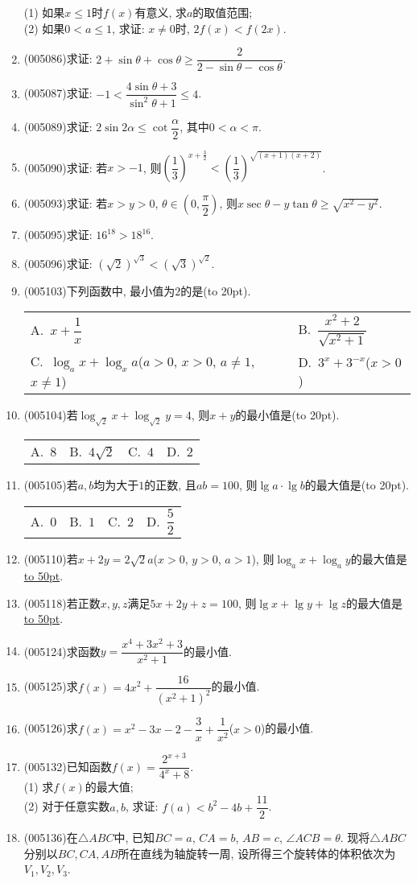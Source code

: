 \documentclass[10pt,a4paper]{article}
\newcommand{\blank}[1]{\underline{\hbox to #1pt{}}}
\newcommand{\bracket}[1]{(\hbox to #1pt{})}
\newcommand{\twoch}[4]{\par\begin{tabular}{p{.46\textwidth}p{.46\textwidth}}
A.~#1& B.~#2\\
C.~#3& D.~#4
\end{tabular}}
\newcommand{\fourch}[4]{\par\begin{tabular}{p{.23\textwidth}p{.23\textwidth}p{.23\textwidth}p{.23\textwidth}}
A.~#1 &B.~#2& C.~#3& D.~#4
\end{tabular}}
\begin{document}
\begin{enumerate}[1.]
(1) 如果$x\le 1$时$f(x)$有意义, 求$a$的取值范围;\\
(2) 如果$0<a\le 1$, 求证: $x\ne 0$时, $2f(x)<f(2x)$.
\item {\tiny (005086)}求证: $2+\sin \theta +\cos \theta \ge \dfrac 2{2-\sin \theta -\cos \theta }$.
\item {\tiny (005087)}求证: $-1<\dfrac{4\sin \theta +3}{\sin^2\theta+1}\le 4$.
\item {\tiny (005089)}求证: $2\sin 2\alpha \le \cot \dfrac{\alpha}2$, 其中$0<\alpha <\pi$.
\item {\tiny (005090)}求证: 若$x>-1$, 则$(\dfrac 13)^{x+\frac 32}<(\dfrac 13)^{\sqrt{(x+1)(x+2)}}$.
\item {\tiny (005093)}求证: 若$x>y>0$, $\theta \in (0,\dfrac{\pi}2)$, 则$x\sec \theta -y\tan \theta \ge \sqrt{x^2-y^2}$.
\item {\tiny (005095)}求证: $16^{18}>18^{16}$.
\item {\tiny (005096)}求证: $(\sqrt 2)^{\sqrt 3}<(\sqrt 3)^{\sqrt 2}$.
\item {\tiny (005103)}下列函数中, 最小值为$2$的是\bracket{20}.
\twoch{$x+\dfrac 1x$}{$\dfrac{x^2+2}{\sqrt{x^2+1}}$}{$\log_ax+\log_xa$($a>0$, $x>0$, $a\ne 1$, $x\ne 1$)}{$3^x+3^{-x}$($x>0$)}
\item {\tiny (005104)}若$\log_{\sqrt 2}x+\log_{\sqrt 2}y=4$, 则$x+y$的最小值是\bracket{20}.
\fourch{$8$}{$4\sqrt 2$}{$4$}{$2$}
\item {\tiny (005105)}若$a,b$均为大于$1$的正数, 且$ab=100$, 则$\lg a\cdot \lg b$的最大值是\bracket{20}.
\fourch{$0$}{$1$}{$2$}{$\dfrac 52$}
\item {\tiny (005110)}若$x+2y=2\sqrt 2a$($x>0$, $y>0$, $a>1$), 则$\log_ax+\log_ay$的最大值是\blank{50}.
\item {\tiny (005118)}若正数$x,y,z$满足$5x+2y+z=100$, 则$\lg x+\lg y+\lg z$的最大值是\blank{50}.
\item {\tiny (005124)}求函数$y=\dfrac{x^4+3x^2+3}{x^2+1}$的最小值.
\item {\tiny (005125)}求$f(x)=4x^2+\dfrac{16}{(x^2+1)^2}$的最小值.
\item {\tiny (005126)}求$f(x)=x^2-3x-2-\dfrac 3x+\dfrac 1{x^2}$($x>0$)的最小值.
\item {\tiny (005132)}已知函数$f(x)=\dfrac{2^{x+3}}{{4^x}+8}$.\\
(1) 求$f(x)$的最大值;\\
(2) 对于任意实数$a,b$, 求证: $f(a)<b^2-4b+\dfrac{11}2$.
\item {\tiny (005136)}在$\triangle ABC$中, 已知$BC=a$, $CA=b$, $AB=c$, $\angle ACB=\theta$. 现将$\triangle ABC$分别以$BC,CA,AB$所在直线为轴旋转一周, 设所得三个旋转体的体积依次为$V_1,V_2,V_3$.\\

\end{enumerate}
\end{document}
